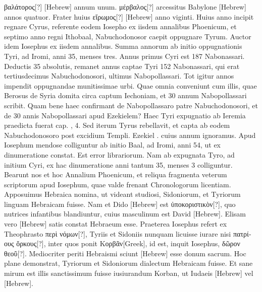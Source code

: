  \textgreek{βαλάτορος[?]} \texthebrew{}[Hebrew]
annum unum.
\textgreek{μέρβαλος[?]} arcessitus Babylone
 \texthebrew{}[Hebrew] annos quatuor.
Frater huius \textgreek{εἴρωμος[?]} \texthebrew{}[Hebrew] anno viginti.
Huius anno 
incipit regnare Cyrus, referente eodem Iosepho ex iisdem annalibus
Phoenicum, et septimo anno regni Ithobaal, Nabuchodonosor
caepit oppugnare Tyrum.
Auctor idem Iosephus ex iisdem
annalibus.
Summa annorum ab initio oppugnationis Tyri, ad
 Iromi, anni 35, menses tres.
Annus primus Cyri est 187 Nabonassari.
Deductis 35 absolutis, remanet annus captae Tyri 152
Nabonassari, qui erat tertiusdecimus Nabuchodonosori, ultimus
Nabopollassari.
Tot igitur annos impendit oppugnandae munitissimae
urbi.
Quae omnia conveniunt cum illis, quae Berosus de Syria
domita circa captum Iechoniam, et 30 annum Nabopollassari scribit.
Quam bene haec confirmant de Nabopollassaro patre Nabuchodonosori,
et de 30 annis Nabopollassari apud Ezekielem?
Haec Tyri expugnatio ab Ieremia praedicta fuerat cap. , 4.
Sed iterum
Tyrus rebellavit, et capta ab eodem Nabuchodonosoro post
excidium Templi.
Ezekiel . cuius annum ignoramus.
Apud
Iosephum mendose colliguntur ab initio Baal, ad  Iromi, anni
54, ut ex dinumeratione constat.
Est error librariorum.
Nam ab expugnata
Tyro, ad initium Cyri, ex hac dinumeratione anni tantum
35, menses 3 colliguntur.
Bearunt nos et hoc Annalium Phoenicum,
et reliqua fragmenta veterum scriptorum apud Iosephum, quae valde
frenant Chronologorum licentiam.
Apposuimus Hebraica
nomina, ut videant studiosi, Sidoniorum, et Tyriorum linguam
Hebraicam fuisse.
%
Nam et Dido \texthebrew{}[Hebrew]
 est \textgreek{ὑποκοριστικὸν[?]},
 quo nutrices
infantibus blandiuntur, cuius masculinum est David \texthebrew{}[Hebrew].
Elisam
vero \texthebrew{}[Hebrew] satis constat Hebraeum esse.
Praeterea Iosephus refert
ex Theophrasto \textgreek{περὶ νόμων[?]}, Tyriis et Sidoniis nunquam licuisse
iurare nisi \textgreek{πατρίους ὅρκους[?]},
 inter quos ponit \textgreek{Κορβᾶν[Greek]}, id est, inquit
Iosephus, \textgreek{δῶρον θεοῦ[?]}.
Mediocriter periti Hebraismi sciunt \texthebrew{}[Hebrew] esse
donum sacrum.
Hoc plane demonstrat, Tyriorum et Sidoniorum
dialectum Hebraicam fuisse.
Et sane mirum est illis sanctissimum
fuisse iusiurandum Korban, ut Iudaeis
 \texthebrew{}[Hebrew] vel \texthebrew{}[Hebrew].
